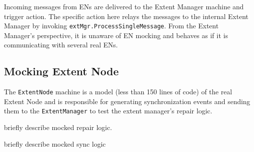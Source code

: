 Incoming messages from ENs are delivered to the Extent Manager machine and trigger action. The specific action here relays the messages to the internal Extent Manager by invoking \texttt{extMgr.ProcessSingleMessage}. From the Extent Manager's perspective, it is unaware of EN mocking and behaves as if it is communicating with several real ENs.

\subsection{Mocking Extent Node}
\label{sec:method:mock_en}

The \texttt{ExtentNode} machine is a model (less than 150 lines of code) of the real Extent Node and is responsible for generating synchronization events and sending them to the \texttt{ExtentManager} to test the extent manager's repair logic.

briefly describe mocked repair logic.

briefly describe mocked sync logic

%
%
%
%
%
%

